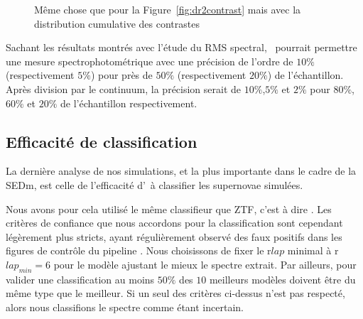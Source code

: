 \documentclass[../main/main.tex]{subfiles}
\begin{document}
\begin{figure}[ht]
  \centering
  \caption[Distribution cumulative du contraste des SNeIa de la DR2 de
  ZTF-Cosmo.]{Même chose que pour la Figure~\ref{fig:dr2contrast} mais
    avec la distribution cumulative des contrastes}
  \label{fig:dr2contrast_cum}
\end{figure}

Sachant les résultats montrés avec l'étude du RMS spectral, \hypergal\
pourrait permettre une mesure spectrophotométrique avec une précision de
l'ordre de $10\%$ (respectivement $5\%$) pour près de $50\%$
(respectivement $20\%$) de l'échantillon.
Après division par le continuum, la précision serait de $10\%$,$5\%$ et $2\%$ pour
$80\%$, $60\%$ et $20\%$ de l'échantillon respectivement.


\subsection{Efficacité de classification}\label{ssec:typingsimu}

La dernière analyse de nos simulations, et la plus importante dans le
cadre de la SEDm, est celle de l'efficacité d'\hypergal\ à classifier
les supernovae simulées.

Nous avons pour cela utilisé le même classifieur que ZTF, c'est à dire
\pkg{SNID}. Les critères de confiance que nous accordons pour la classification
sont cependant légèrement plus stricts, ayant régulièrement observé
des faux positifs dans les figures de contrôle du pipeline \pysedm. Nous
choisissons de fixer le r$lap$ minimal à r$lap_{min}=6$ pour le modèle
ajustant le mieux le spectre extrait. Par ailleurs, pour valider une
classification au moins $50\%$ des $10$ meilleurs modèles doivent être
du même type que le meilleur. Si un seul des critères ci-dessus n'est pas
respecté, alors nous classifions le spectre comme étant incertain.\\
\end{document}
